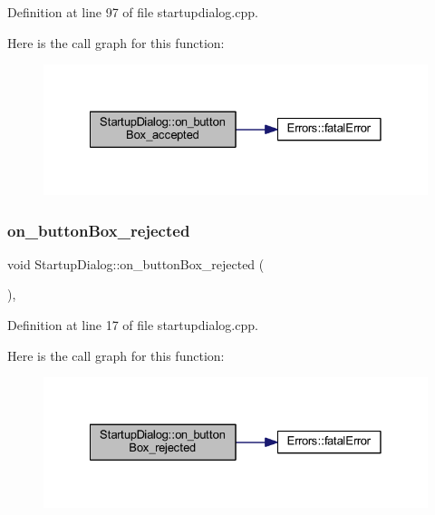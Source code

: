 Definition at line 97 of file startupdialog.\+cpp.

Here is the call graph for this function\+:
\nopagebreak
\begin{figure}[H]
\begin{center}
\leavevmode
\includegraphics[width=328pt]{class_startup_dialog_acf772dfd42cfc24f058372cb6ee3ae24_cgraph}
\end{center}
\end{figure}
\mbox{\label{class_startup_dialog_a7aee3b6219d164760589c51aa7989bad}} 
\subsubsection{\texorpdfstring{on\_buttonBox\_rejected}{on\_buttonBox\_rejected}}
{\footnotesize\ttfamily void Startup\+Dialog\+::on\+\_\+button\+Box\+\_\+rejected (\begin{DoxyParamCaption}{ }\end{DoxyParamCaption})\hspace{0.3cm}{\ttfamily [private]}, {\ttfamily [slot]}}



Definition at line 17 of file startupdialog.\+cpp.

Here is the call graph for this function\+:
\nopagebreak
\begin{figure}[H]
\begin{center}
\leavevmode
\includegraphics[width=328pt]{class_startup_dialog_a7aee3b6219d164760589c51aa7989bad_cgraph}
\end{center}
\end{figure}
\mbox{\label{class_startup_dialog_a5d6aa20d81bc223b2e9931811b2aca95}} 
